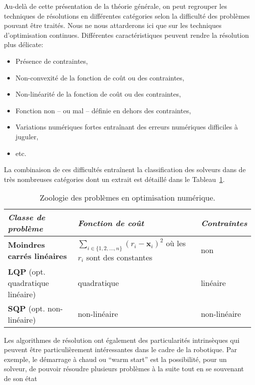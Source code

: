 Au-delà de cette présentation de la théorie générale, on peut
regrouper les techniques de résolutions en différentes catégories
selon la difficulté des problèmes pouvant être traités. Nous ne nous
attarderons ici que sur les techniques d'optimisation
continues. Différentes caractéristiques peuvent rendre la résolution
plus délicate:
%
\begin{itemize}
\item Présence de contraintes,
\item Non-convexité de la fonction de coût ou des contraintes,
\item Non-linéarité de la fonction de coût ou des contraintes,
\item Fonction non -- ou mal -- définie en dehors des contraintes,
\item Variations numériques fortes entraînant des erreurs numériques
  difficiles à juguler,
\item etc.
\end{itemize}
%
La combinaison de ces difficultés entraînent la classification des
solveurs dans de très nombreuses catégories dont un extrait est
détaillé dans le Tableau~\ref{tbl:chap1_solver}.
%
\begin{table}\label{tbl:chap1_solver}
\begin{center}
\begin{tabular}{|>{\small}p{}|>{\small}p{}|>{\small}p{}|}
\hline
\textit{Classe de problème} & \textit{Fonction de coût} & \textit{Contraintes}\\
\hline
\textbf{Moindres carrés linéaires} & $\sum_{i \in \{1, 2, \ldots, n\}} (r_i - \mathbf{x}_i)^2$ où les $r_i$ sont des constantes & non \\
\hline
\textbf{LQP} \small{(opt. quadratique linéaire)} & quadratique & linéaire \\
\hline
\textbf{SQP} \small{(opt. non-linéaire)} & non-linéaire & non-linéaire \\
\hline
\end{tabular}
\end{center}
\caption{Zoologie des problèmes en optimisation numérique.}
\end{table}
%
Les algorithmes de résolution ont également des particularités
intrinsèques qui peuvent être particulièrement intéressantes dans le
cadre de la robotique. Par exemple, le démarrage à chaud ou ``warm
start''   est la possibilité, pour un solveur, de pouvoir résoudre
plusieurs problèmes à la suite tout en se souvenant de son état
